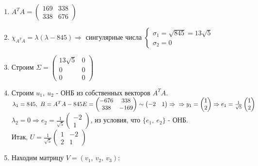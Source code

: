 \documentclass[12pt, letterpaper, twoside]{article}
\begin{document}
\begin{enumerate}
    \item $A^T A = \begin{pmatrix}
        169 & 338\\
        338 & 676
    \end{pmatrix}$
    \item $\chi_{A^T A} = \lambda(\lambda - 845)\Rightarrow$ сингулярные числа $\begin{cases}
        \sigma_1 = \sqrt{845} = 13\sqrt{5}\\
        \sigma_2 = 0
    \end{cases}$
    \item Строим $\Sigma = \begin{pmatrix}
        13\sqrt{5} & 0\\
        0 & 0\\
        0 & 0
    \end{pmatrix}$
    \item Строим $u_1,\ u_2$ - ОНБ из собственных векторов $A^T A$.\\
    $\lambda_1 = 845,\ B = A^T A - 845 E = \begin{pmatrix}
        -676 & 338\\
        338 & -169
    \end{pmatrix} \sim \begin{pmatrix}
        -2 & 1
    \end{pmatrix}\Rightarrow\\ \Rightarrow y_1 = \begin{pmatrix}
        1\\ 2
    \end{pmatrix}\Rightarrow e_1 = \frac{1}{\sqrt{5}} \begin{pmatrix}
        1\\ 2
    \end{pmatrix}$\\
    $\lambda_2 = 0\Rightarrow e_2 = \frac{1}{\sqrt{5}} \begin{pmatrix}
        -2 \\ 1
    \end{pmatrix}$, из условия, что $\{e_1,\ e_2\}$ - ОНБ.\\
    Итак, $U = \frac{1}{\sqrt{5}}\begin{pmatrix}
        1 & -2\\
        2 & 1
    \end{pmatrix}$
    \item Находим матрицу $V = (v_1,\ v_2,\ v_3)$:\\

\end{enumerate}
\end{document}
